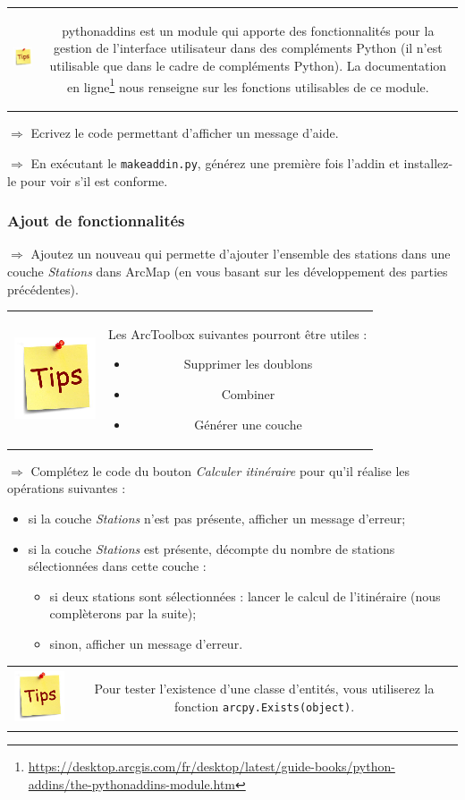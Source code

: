 \documentclass[11pt]{article}
\newcommand{\action}{$\Rightarrow$ }
\newenvironment{note}{%
	\begin{tabular}[t t]{c c}
		\includegraphics{img/tips.png}
		 &
		\begin{minipage}[c]{0.9\linewidth}
			\begin{sffamily}
}{%
			\end{sffamily}
		\end{minipage}
	\end{tabular}
}
\newcommand{\code}[1]{\lstinline{#1}}
\begin{document}
\begin{note}
pythonaddins est un module qui apporte des fonctionnalités pour la gestion de l'interface utilisateur dans des compléments Python (il n'est utilisable que dans le cadre de compléments Python). La documentation en ligne\footnote{\url{https://desktop.arcgis.com/fr/desktop/latest/guide-books/python-addins/the-pythonaddins-module.htm}} nous renseigne sur les fonctions utilisables de ce module.
\end{note}

\action Ecrivez le code permettant d'afficher un message d'aide.

\action En exécutant le \code{makeaddin.py}, générez une première fois l'addin et installez-le pour voir s'il est conforme.


\subsubsection{Ajout de fonctionnalités}
\action Ajoutez un nouveau qui permette d'ajouter l'ensemble des stations dans une couche \textit{Stations} dans ArcMap (en vous basant sur les développement des parties précédentes).

\begin{note}
Les ArcToolbox suivantes pourront être utiles :
\begin{itemize}
	\item Supprimer les doublons
	\item Combiner
	\item Générer une couche
\end{itemize}
\end{note}

\action Complétez le code du bouton \textit{Calculer itinéraire} pour qu'il réalise les opérations suivantes :
\begin{itemize}
	\item si la couche \textit{Stations} n'est pas présente, afficher un message d'erreur;
	\item si la couche \textit{Stations} est présente, décompte du nombre de stations sélectionnées dans cette couche :
	\begin{itemize}
		\item si deux stations sont sélectionnées : lancer le calcul de l'itinéraire (nous complèterons par la suite);
		\item sinon, afficher un message d'erreur.
	\end{itemize}
\end{itemize}

\begin{note}
Pour tester l'existence d'une classe d'entités, vous utiliserez la fonction \code{arcpy.Exists(object)}.
\end{note}
\end{document}

